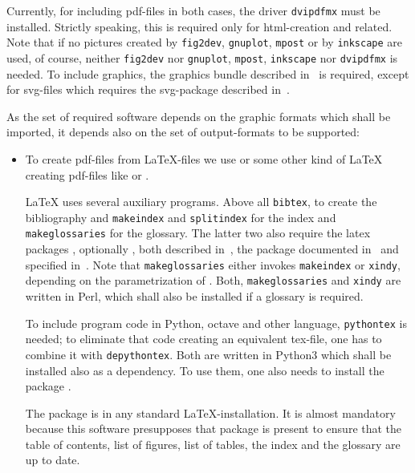 Currently, for including pdf-files in both cases, 
the driver \texttt{dvipdfmx} must be installed. 
Strictly speaking, this is required only for html-creation and related. 
Note that if no pictures created by \texttt{fig2dev}, \texttt{gnuplot}, 
\texttt{mpost} or by \texttt{inkscape} are used, of course, 
neither \texttt{fig2dev} nor \texttt{gnuplot},
\texttt{mpost}, \texttt{inkscape} 
nor \texttt{dvipdfmx} is needed. 
To include graphics, the graphics bundle described in~\cite{GraX} is required, 
except for svg-files which requires the svg-package 
described in~\cite{SvgP}. 

As the set of required software depends on the graphic formats 
which shall be imported, 
it depends also on the set of output-formats 
to be supported: 
%
\begin{itemize}
\item
To create pdf-files from \LaTeX-files we use \lualatex{} 
or some other kind of \LaTeX{} creating pdf-files 
like \xelatex{} or \pdflatex. 

\LaTeX{} uses several auxiliary programs. 
Above all \texttt{bibtex}, to create the bibliography 
and \texttt{makeindex} and \texttt{splitindex} for the index 
and \texttt{makeglossaries} for the glossary. 
The latter two 
also require the latex packages , optionally , 
both described in~\cite{MkidxShIdxP}, 
the package  documented in~\cite{SplitidxP}
and  specified in~\cite{GloP}. 
Note that \texttt{makeglossaries} either invokes \texttt{makeindex} 
or \texttt{xindy}, depending on the parametrization of . 
Both, \texttt{makeglossaries} and \texttt{xindy} are written in Perl, 
which shall also be installed if a glossary is required. 

To include program code in Python, octave and other language, 
\texttt{pythontex} is needed; to eliminate that code creating an equivalent tex-file, 
one has to combine it with \texttt{depythontex}. 
Both are written in Python3 which shall be installed also as a dependency. 
To use them, one also needs to install the package . 

The package  is in any standard \LaTeX-installation. 
It is almost mandatory 
because this software presupposes that package is present  
to ensure that the table of contents, list of figures, list of tables, 
the index and the glossary are up to date. 


\end{itemize}
